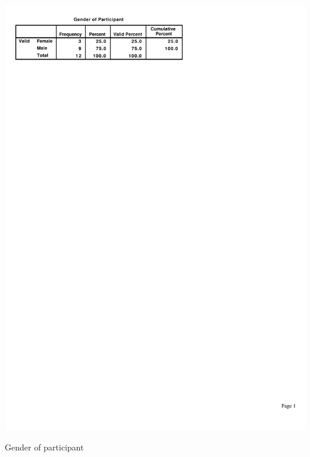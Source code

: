 \documentclass[a4paper, 12pt]{report}
\begin{document}
\begin{table}[ht]
\centerline{\includegraphics{figures/Gender.pdf}}
\caption{Gender of participant}
\label{fig:partic_gender}
\end{table}
\end{document}
